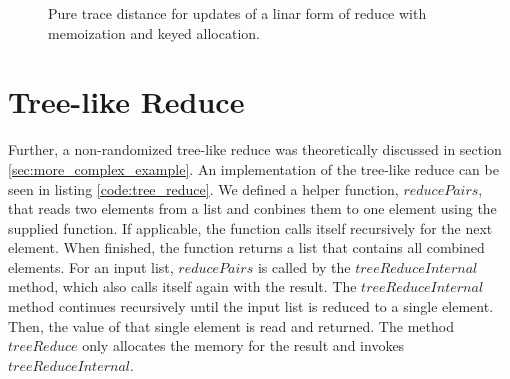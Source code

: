 \begin{figure}
\centering
{}
\caption{Pure trace distance for updates of a linar form of reduce with memoization and keyed allocation.}
\label{plot:memo_reduce_pure}
\end{figure}

\section{Tree-like Reduce}

Further, a non-randomized tree-like reduce was theoretically discussed in section \ref{sec:more_complex_example}. An implementation of the tree-like reduce can be seen in listing \ref{code:tree_reduce}. We defined a helper function, $reducePairs$, that reads two elements from a list and conbines them to one element using the supplied function. If applicable, the function calls itself recursively for the next element. When finished, the function returns a list that contains all combined elements. For an input list, $reducePairs$ is called by the $treeReduceInternal$ method, which also calls itself again with the result. The $treeReduceInternal$ method continues recursively until the input list is reduced to a single element. Then, the value of that single element is read and returned. The method $treeReduce$ only allocates the memory for the result and invokes $treeReduceInternal$.


